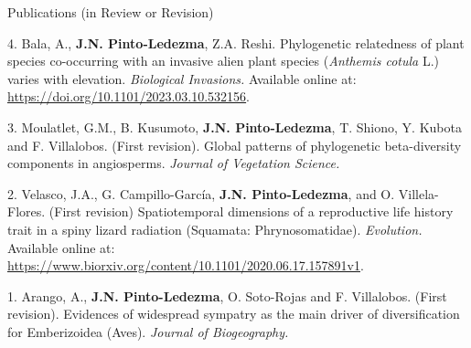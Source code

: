 \documentclass{resume} %
\begin{document}
\begin{rSection}{Publications (in Review or Revision)} 

\normalfont 

{4.} {Bala, A.,} {\bf{J.N. Pinto-Ledezma\dag}}, {Z.A. Reshi\dag. Phylogenetic relatedness of plant species co-occurring with an invasive alien plant species ({\em Anthemis cotula} L.) varies with elevation.} {\em Biological Invasions.} {Available online at:} \url {https://doi.org/10.1101/2023.03.10.532156}.

{3.} {Moulatlet, G.M., B. Kusumoto,} {\bf{J.N. Pinto-Ledezma}}, { T. Shiono, Y. Kubota and F. Villalobos. (First revision). Global patterns of phylogenetic beta-diversity components in angiosperms.} {\em Journal of Vegetation Science.}

{2.} {Velasco, J.A., G. Campillo-García,} {\bf{J.N. Pinto-Ledezma}}, {and O. Villela-Flores. (First revision) Spatiotemporal dimensions of a reproductive life history trait in a spiny lizard radiation (Squamata: Phrynosomatidae).} {\em Evolution.} {Available online at:} \url {https://www.biorxiv.org/content/10.1101/2020.06.17.157891v1}.

{1.} {Arango, A.,} {\bf{J.N. Pinto-Ledezma}}, { O. Soto-Rojas and F. Villalobos. (First revision). Evidences of widespread sympatry as the main driver of diversification for Emberizoidea (Aves).} {\em Journal of Biogeography.}



\end{rSection}



\end{document}
